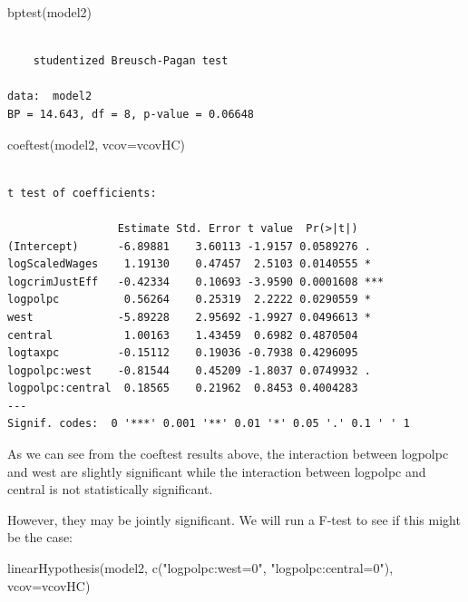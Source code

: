 \documentclass[]{article}
\newenvironment{Shaded}{}{}
\newcommand{\DataTypeTok}[1]{#1}
\newcommand{\KeywordTok}[1]{\textcolor[rgb]{0.00,0.00,1.00}{#1}}
\newcommand{\NormalTok}[1]{#1}
\newcommand{\StringTok}[1]{\textcolor[rgb]{0.00,0.50,0.50}{#1}}
\begin{document}
\begin{Shaded}
\begin{Highlighting}[]
\KeywordTok{bptest}\NormalTok{(model2)}
\end{Highlighting}
\end{Shaded}

\begin{verbatim}

    studentized Breusch-Pagan test

data:  model2
BP = 14.643, df = 8, p-value = 0.06648
\end{verbatim}

\begin{Shaded}
\begin{Highlighting}[]
\KeywordTok{coeftest}\NormalTok{(model2, }\DataTypeTok{vcov=}\NormalTok{vcovHC)}
\end{Highlighting}
\end{Shaded}

\begin{verbatim}

t test of coefficients:

                 Estimate Std. Error t value  Pr(>|t|)    
(Intercept)      -6.89881    3.60113 -1.9157 0.0589276 .  
logScaledWages    1.19130    0.47457  2.5103 0.0140555 *  
logcrimJustEff   -0.42334    0.10693 -3.9590 0.0001608 ***
logpolpc          0.56264    0.25319  2.2222 0.0290559 *  
west             -5.89228    2.95692 -1.9927 0.0496613 *  
central           1.00163    1.43459  0.6982 0.4870504    
logtaxpc         -0.15112    0.19036 -0.7938 0.4296095    
logpolpc:west    -0.81544    0.45209 -1.8037 0.0749932 .  
logpolpc:central  0.18565    0.21962  0.8453 0.4004283    
---
Signif. codes:  0 '***' 0.001 '**' 0.01 '*' 0.05 '.' 0.1 ' ' 1
\end{verbatim}

As we can see from the coeftest results above, the interaction between
logpolpc and west are slightly significant while the interaction between
logpolpc and central is not statistically significant.

However, they may be jointly significant. We will run a F-test to see if
this might be the case:

\begin{Shaded}
\begin{Highlighting}[]
\KeywordTok{linearHypothesis}\NormalTok{(model2, }\KeywordTok{c}\NormalTok{(}\StringTok{"logpolpc:west=0"}\NormalTok{, }\StringTok{"logpolpc:central=0"}\NormalTok{), }\DataTypeTok{vcov=}\NormalTok{vcovHC)}
\end{Highlighting}
\end{Shaded}
\end{document}
